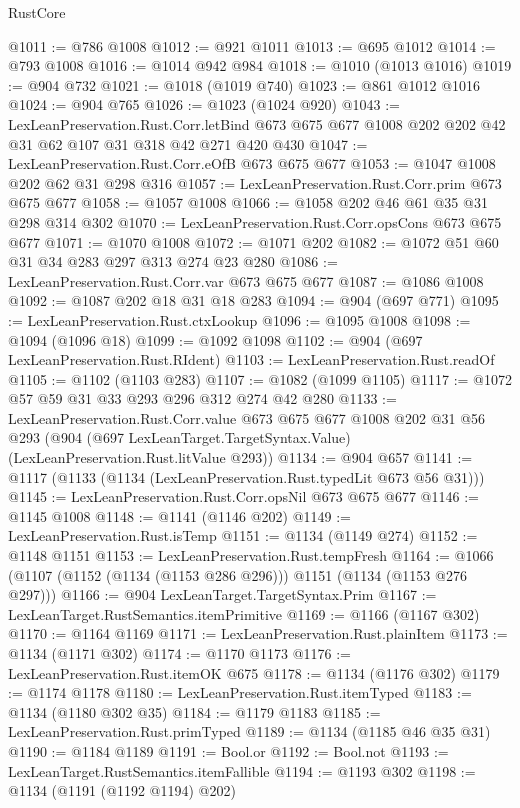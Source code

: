 \begin{lexlean}{RustCore}
\begin{coremodule}
{\begin{coremodule}
{{{{{{{{{@1011 := @786 @1008
@1012 := @921 @1011
@1013 := @695 @1012
@1014 := @793 @1008
@1016 := @1014 @942 @984
@1018 := @1010 (@1013 @1016)
@1019 := @904 @732
@1021 := @1018 (@1019 @740)
@1023 := @861 @1012 @1016
@1024 := @904 @765
@1026 := @1023 (@1024 @920)
@1043 := LexLeanPreservation.Rust.Corr.letBind
    @673
    @675
    @677
    @1008
    @202
    @202
    @42
    @31
    @62
    @107
    @31
    @318
    @42
    @271
    @420
    @430
@1047 := LexLeanPreservation.Rust.Corr.eOfB @673 @675 @677
@1053 := @1047 @1008 @202 @62 @31 @298 @316
@1057 := LexLeanPreservation.Rust.Corr.prim @673 @675 @677
@1058 := @1057 @1008
@1066 := @1058 @202 @46 @61 @35 @31 @298 @314 @302
@1070 := LexLeanPreservation.Rust.Corr.opsCons @673 @675 @677
@1071 := @1070 @1008
@1072 := @1071 @202
@1082 := @1072 @51 @60 @31 @34 @283 @297 @313 @274 @23 @280
@1086 := LexLeanPreservation.Rust.Corr.var @673 @675 @677
@1087 := @1086 @1008
@1092 := @1087 @202 @18 @31 @18 @283
@1094 := @904 (@697 @771)
@1095 := LexLeanPreservation.Rust.ctxLookup
@1096 := @1095 @1008
@1098 := @1094 (@1096 @18)
@1099 := @1092 @1098
@1102 := @904 (@697 LexLeanPreservation.Rust.RIdent)
@1103 := LexLeanPreservation.Rust.readOf
@1105 := @1102 (@1103 @283)
@1107 := @1082 (@1099 @1105)
@1117 := @1072 @57 @59 @31 @33 @293 @296 @312 @274 @42 @280
@1133 := LexLeanPreservation.Rust.Corr.value
    @673
    @675
    @677
    @1008
    @202
    @31
    @56
    @293
    (@904 (@697 LexLeanTarget.TargetSyntax.Value) (LexLeanPreservation.Rust.litValue @293))
@1134 := @904 @657
@1141 := @1117 (@1133 (@1134 (LexLeanPreservation.Rust.typedLit @673 @56 @31)))
@1145 := LexLeanPreservation.Rust.Corr.opsNil @673 @675 @677
@1146 := @1145 @1008
@1148 := @1141 (@1146 @202)
@1149 := LexLeanPreservation.Rust.isTemp
@1151 := @1134 (@1149 @274)
@1152 := @1148 @1151
@1153 := LexLeanPreservation.Rust.tempFresh
@1164 := @1066 (@1107 (@1152 (@1134 (@1153 @286 @296))) @1151 (@1134 (@1153 @276 @297)))
@1166 := @904 LexLeanTarget.TargetSyntax.Prim
@1167 := LexLeanTarget.RustSemantics.itemPrimitive
@1169 := @1166 (@1167 @302)
@1170 := @1164 @1169
@1171 := LexLeanPreservation.Rust.plainItem
@1173 := @1134 (@1171 @302)
@1174 := @1170 @1173
@1176 := LexLeanPreservation.Rust.itemOK @675
@1178 := @1134 (@1176 @302)
@1179 := @1174 @1178
@1180 := LexLeanPreservation.Rust.itemTyped
@1183 := @1134 (@1180 @302 @35)
@1184 := @1179 @1183
@1185 := LexLeanPreservation.Rust.primTyped
@1189 := @1134 (@1185 @46 @35 @31)
@1190 := @1184 @1189
@1191 := Bool.or
@1192 := Bool.not
@1193 := LexLeanTarget.RustSemantics.itemFallible
@1194 := @1193 @302
@1198 := @1134 (@1191 (@1192 @1194) @202)
}}}}}}}}}
\end{coremodule}}
\end{coremodule}
\end{lexlean}
